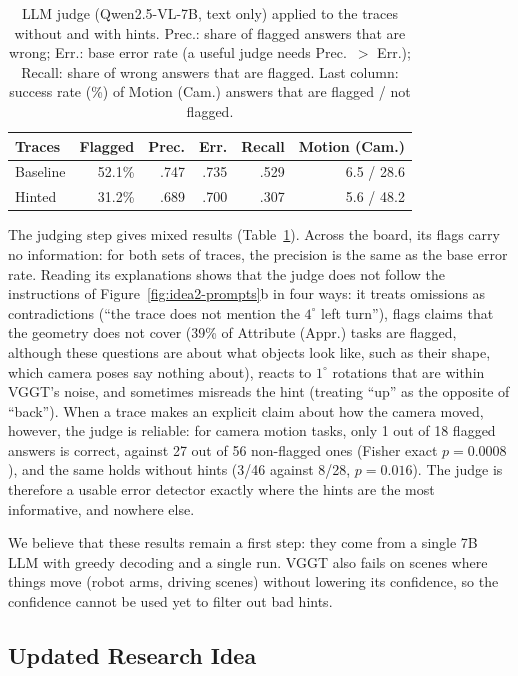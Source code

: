 \begin{table}[t]
\centering
\small
\caption{LLM judge (Qwen2.5-VL-7B, text only) applied to the traces without and with hints. Prec.: share of flagged answers that are wrong; Err.: base error rate (a useful judge needs Prec.\ $>$ Err.); Recall: share of wrong answers that are flagged. Last column: success rate (\%) of Motion (Cam.) answers that are flagged / not flagged.}
\label{tab:idea2-judge}
\begin{tabular}{lrrrrr}
\toprule
Traces & Flagged & Prec. & Err. & Recall & Motion (Cam.) \\
\midrule
Baseline & 52.1\% & .747 & .735 & .529 & 6.5 / 28.6 \\
Hinted   & 31.2\% & .689 & .700 & .307 & 5.6 / 48.2 \\
\bottomrule
\end{tabular}
\end{table}

The judging step gives mixed results (Table~\ref{tab:idea2-judge}). Across the board, its flags carry no information: for both sets of traces, the precision is the same as the base error rate. Reading its explanations shows that the judge does not follow the instructions of Figure~\ref{fig:idea2-prompts}b in four ways: it treats omissions as contradictions (``the trace does not mention the $4^\circ$ left turn''), flags claims that the geometry does not cover (39\% of Attribute (Appr.) tasks are flagged, although these questions are about what objects look like, such as their shape, which camera poses say nothing about), reacts to $1^\circ$ rotations that are within VGGT's noise, and sometimes misreads the hint (treating ``up'' as the opposite of ``back''). When a trace makes an explicit claim about how the camera moved, however, the judge is reliable: for camera motion tasks, only 1 out of 18 flagged answers is correct, against 27 out of 56 non-flagged ones (Fisher exact $p=0.0008$), and the same holds without hints (3/46 against 8/28, $p=0.016$). The judge is therefore a usable error detector exactly where the hints are the most informative, and nowhere else.

We believe that these results remain a first step: they come from a single 7B LLM with greedy decoding and a single run. VGGT also fails on scenes where things move (robot arms, driving scenes) without lowering its confidence, so the confidence cannot be used yet to filter out bad hints.

\subsection{Updated Research Idea}
\label{sec:idea2-updated}

